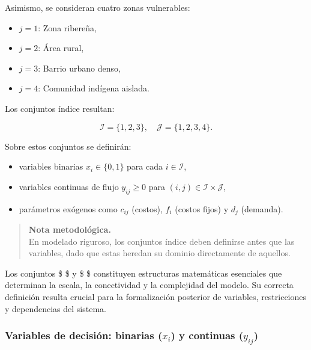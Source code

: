 \documentclass[
  spanish,
  letterpaper,
  DIV=11,
  numbers=noendperiod]{scrartcl}
\providecommand{\tightlist}{%
  \setlength{\itemsep}{0pt}\setlength{\parskip}{0pt}}
\begin{document}
Asimismo, se consideran cuatro zonas vulnerables:

\begin{itemize}
\tightlist
\item
  \(j = 1\): Zona ribereña,\\
\item
  \(j = 2\): Área rural,\\
\item
  \(j = 3\): Barrio urbano denso,\\
\item
  \(j = 4\): Comunidad indígena aislada.
\end{itemize}

Los conjuntos índice resultan:

\[
\mathcal{I} = \{1,2,3\}, \quad 
\mathcal{J} = \{1,2,3,4\}.
\]

Sobre estos conjuntos se definirán:

\begin{itemize}
\tightlist
\item
  variables binarias \(x_i \in \{0,1\}\) para cada
  \(i \in \mathcal{I}\),\\
\item
  variables continuas de flujo \(y_{ij} \ge 0\) para
  \((i,j) \in \mathcal{I} \times \mathcal{J}\),\\
\item
  parámetros exógenos como \(c_{ij}\) (costos), \(f_i\) (costos fijos) y
  \(d_j\) (demanda).
\end{itemize}

\begin{quote}
\textbf{Nota metodológica.}\\
En modelado riguroso, los conjuntos índice deben definirse antes que las
variables, dado que estas heredan su dominio directamente de aquellos.
\end{quote}

Los conjuntos \$  \$ y \$  \$ constituyen
estructuras matemáticas esenciales que determinan la escala, la
conectividad y la complejidad del modelo. Su correcta definición resulta
crucial para la formalización posterior de variables, restricciones y
dependencias del sistema.

\subsubsection{\texorpdfstring{Variables de decisión: binarias (\(x_i\))
y continuas
(\(y_{ij}\))}{Variables de decisión: binarias (x\_i) y continuas (y\_\{ij\})}}\label{variables-de-decisiuxf3n-binarias-x_i-y-continuas-y_ij}
\end{document}
